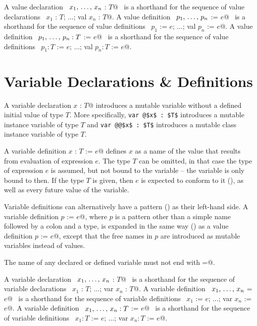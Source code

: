 A value declaration ~\lstinline@val $x_1 ,\, \ldots ,\, x_n$ : $T$@~ is a shorthand for the sequence of value declarations ~\lstinline@val $x_1$ : $T$; $\ldots$; val $x_n$ : $T$@. A value definition ~\lstinline@val $p_1 ,\, \ldots ,\, p_n$ := $e$@~ is a shorthand for the sequence of value definitions ~\lstinline@val $p_1$ := $e$; $\ldots$; val $p_n$ := $e$@. A value definition ~\lstinline@val $p_1 ,\, \ldots ,\, p_n : T$ := $e$@~ is a shorthand for the sequence of value definitions ~\lstinline@val $p_1 : T$ := $e$; $\ldots$; val $p_n : T$ := $e$@.

\section{Variable Declarations \& Definitions}
\label{sec:variable-dcl-def}

A variable declaration \lstinline@var $x$ : $T$@ introduces a mutable variable without a defined initial value of type $T$. More specifically, \lstinline+var @$x$ : $T$+ introduces a mutable instance variable of type $T$ and \lstinline+var @@$x$ : $T$+ introduces a mutable class instance variable of type $T$. 

A variable definition \lstinline@val $x$ : $T$ := $e$@ defines $x$ as a name of the value that results from evaluation of expression $e$. The type $T$ can be omitted, in that case the type of expression $e$ is assumed, but not bound to the variable -- the variable is only bound to  then. If the type $T$ is given, then $e$ is expected to conform to it (), as well as every future value of the variable. 

Variable definitions can alternatively have a pattern () as their left-hand side. A variable definition \lstinline@var $p$ := $e$@, where $p$ is a pattern other than a simple name followed by a colon and a type, is expanded in the same way () as a value definition \lstinline@val $p$ := $e$@, except that the free names in $p$ are introduced as mutable variables instead of values. 

The name of any declared or defined variable must not end with \lstinline@=@. 

A variable declaration ~\lstinline@var $x_1 ,\, \ldots ,\, x_n$ : $T$@~ is a
shorthand for the sequence of variable declarations ~\lstinline@var $x_1$ : $T$; $\ldots$; var $x_n$ : $T$@. A variable definition ~\lstinline@var $x_1 ,\, \ldots ,\, x_n$ = $e$@~ is a shorthand for the sequence of variable definitions ~\lstinline@var $x_1$ := $e$; $\ldots$; var $x_n$ := $e$@. A variable definition ~\lstinline@var $x_1 ,\, \ldots ,\, x_n : T$ := $e$@~ is a shorthand for the sequence of variable definitions ~\lstinline@var $x_1 : T$ := $e$; $\ldots$; var $x_n : T$ := $e$@.

